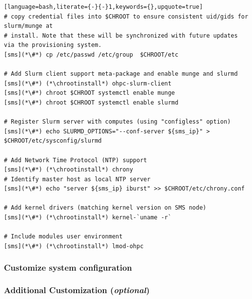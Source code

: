 \documentclass[letterpaper]{article}
\newcommand{\chrootinstall}{yum -y --installroot=\$CHROOT install}
\begin{document}
\begin{lstlisting}[language=bash,literate={-}{-}1,keywords={},upquote=true]
# copy credential files into $CHROOT to ensure consistent uid/gids for slurm/munge at
# install. Note that these will be synchronized with future updates via the provisioning system.
[sms](*\#*) cp /etc/passwd /etc/group  $CHROOT/etc

# Add Slurm client support meta-package and enable munge and slurmd
[sms](*\#*) (*\chrootinstall*) ohpc-slurm-client
[sms](*\#*) chroot $CHROOT systemctl enable munge
[sms](*\#*) chroot $CHROOT systemctl enable slurmd

# Register Slurm server with computes (using "configless" option)
[sms](*\#*) echo SLURMD_OPTIONS="--conf-server ${sms_ip}" > $CHROOT/etc/sysconfig/slurmd

# Add Network Time Protocol (NTP) support
[sms](*\#*) (*\chrootinstall*) chrony
# Identify master host as local NTP server
[sms](*\#*) echo "server ${sms_ip} iburst" >> $CHROOT/etc/chrony.conf

# Add kernel drivers (matching kernel version on SMS node)
[sms](*\#*) (*\chrootinstall*) kernel-`uname -r`

# Include modules user environment
[sms](*\#*) (*\chrootinstall*) lmod-ohpc
\end{lstlisting}

\subsubsection{Customize system configuration} \label{sec:master_customization}







\subsubsection{Additional Customization ({\em optional})} \label{sec:addl_customizations}

\end{document}
